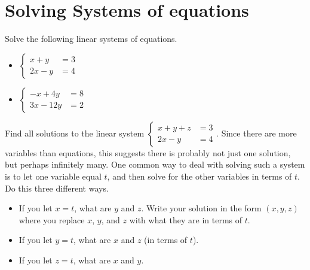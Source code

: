 \fi
\section{Solving Systems of equations}


\begin{problem}
		Solve the following linear systems of equations.
\begin{itemize}
\item $\begin{cases}x+y&=3\\2x-y&=4\end{cases}$
\item $\begin{cases}-x + 4y&=8\\3x - 12y&=2\end{cases}$
\end{itemize}
\end{problem}

\begin{problem}
Find all solutions to the linear system 
$\begin{cases}x+y+z&=3\\2x-y&=4\end{cases}$.  
Since there are more variables than equations, this suggests there is probably not just one solution, but perhaps infinitely many.  One common way to deal with solving such a system is to let one variable equal $t$, and then solve for the other variables in terms of $t$. Do this three different ways.
\begin{itemize}
\item If you let $x=t$, what are $y$ and $z$.  Write your solution in the form $(x,y,z)$ where you replace $x$, $y$, and $z$ with what they are in terms of $t$.
\item If you let $y=t$, what are $x$ and $z$ (in terms of $t$).
\item If you let $z=t$, what are $x$ and $y$.
\end{itemize}
\end{problem}


